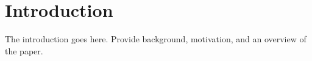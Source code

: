 \section{Introduction}
The introduction goes here. Provide background, motivation, and an overview of the paper.